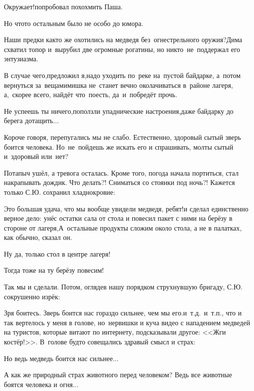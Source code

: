 \diagdash Окружает!\mdash попробовал похохмить Паша.

Но что\sdash то остальным было не особо до юмора.

\diagdash Наши предки как\sdash то же охотились на медведя без~огнестрельного оружия?\mdash Дима схватил топор и~вырубил две огромные рогатины, но никто~не~поддержал его энтузиазма. 

\diagdash В случае чего,\mdash предложил я,\mdash надо уходить по~реке на~пустой байдарке, а~потом вернуться за~вещами\mdash мишка не~станет вечно околачиваться в~районе лагеря, а,~скорее всего, найдёт что~поесть, да~и~побредёт прочь. 

\diagdash Не успеешь ты ничего,\mdash поползли упаднические настроения,\mdash даже байдарку до берега дотащить$\ldots$

Короче говоря, перепугались мы не слабо. Естественно, здоровый сытый зверь боится человека. Но~не~пойдешь же искать его и спрашивать, мол\mdash ты сытый и~здоровый или~нет? 

Потапыч ушёл, а тревога осталась. Кроме того, погода начала портиться, стал накрапывать дождик. Что делать?! Сниматься со стоянки под ночь?! Кажется только С.Ю. сохранил хладнокровие:

\diagdash Это большая удача, что мы вообще увидели медведя, ребят!\mdash и сделал единственно верное дело: унёс остатки сала от стола и повесил пакет с ними на берёзу в стороне от лагеря,\mdash А~остальные продукты сложим около стола, а не в палатках, как обычно, \mdash сказал он. 

\diagdash Ну да, только стол в центре лагеря!

\diagdash Тогда тоже на ту берёзу повесим!

Так мы и сделали. Потом, оглядев нашу порядком струхнувшую бригаду, С.Ю. сокрушенно изрёк:

\diagdash Зря боитесь. Зверь боится нас гораздо сильнее, чем мы его.\mdash и~т.д.~и~т.п., что и так вертелось у меня в голове, но~нервишки и куча видео с нападением медведей на туристов, которые витают по интернету, подсказывали другое: <<Жги костёр!>>. В~голове будто совещались здравый смысл и страх:

\diagdash Но ведь медведь боится нас сильнее$\ldots$  


\diagdash А как же природный страх животного перед человеком? Ведь все животные боятся человека и огня$\ldots$  


